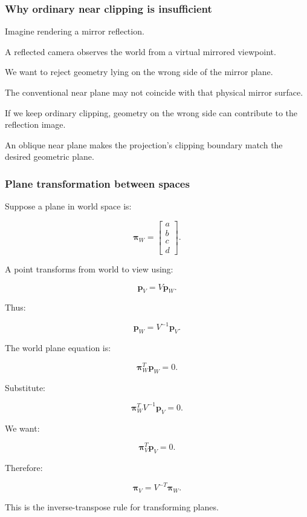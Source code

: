 \subsubsection{Why ordinary near clipping is insufficient}\label{why-ordinary-near-clipping-is-insufficient}

Imagine rendering a mirror reflection.

A reflected camera observes the world from a virtual mirrored viewpoint.

We want to reject geometry lying on the wrong side of the mirror plane.

The conventional near plane may not coincide with that physical mirror surface.

If we keep ordinary clipping, geometry on the wrong side can contribute to the reflection image.

An oblique near plane makes the projection's clipping boundary match the desired geometric plane.

\subsubsection{Plane transformation between spaces}\label{plane-transformation-between-spaces}

Suppose a plane in world space is:

\[
 \boldsymbol\pi_W= \begin{bmatrix} a\\b\\c\\d \end{bmatrix}.
\]

A point transforms from world to view using:

\[
 \mathbf p_V=V\mathbf p_W.
\]

Thus:

\[
 \mathbf p_W=V^{-1}\mathbf p_V.
\]

The world plane equation is:

\[
 \boldsymbol\pi_W^T\mathbf p_W=0.
\]

Substitute:

\[
 \boldsymbol\pi_W^TV^{-1}\mathbf p_V=0.
\]

We want:

\[
 \boldsymbol\pi_V^T\mathbf p_V=0.
\]

Therefore:

\[
 \boxed{ \boldsymbol\pi_V=V^{-T}\boldsymbol\pi_W }.
\]

This is the inverse-transpose rule for transforming planes.

